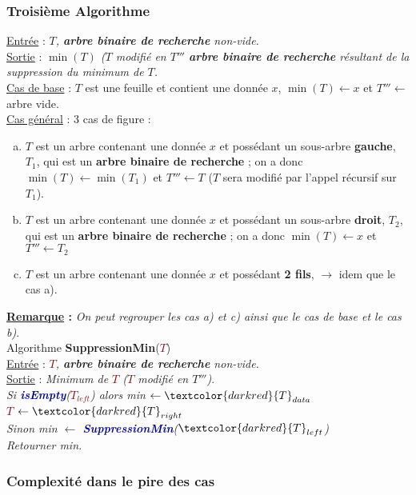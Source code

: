 \documentclass{article}
\newcommand{\abr}{\textbf{arbre binaire de recherche }}
\newcommand{\algo}[1]{\textcolor{darkblue}{\textbf{#1}}}
\newcommand{\param}[1]{\textcolor{darkred}{#1}}
\begin{document}
\subsubsection{Troisième Algorithme}

\noindent\underline{Entrée} : \textit{$T$, \abr non-vide.} \\
\underline{Sortie} : \textit{$\min{(T)}$ ($T$ modifié en $T'''$ \abr résultant de la suppression du minimum de $T$.} \\

\noindent\underline{Cas de base} : $T$ est une feuille et contient une donnée $x$, $\min{(T)}\leftarrow x$ et 
$T'''\leftarrow$ arbre vide.\\
\underline{Cas général} : 3 cas de figure : \\
\begin{enumerate}[a)]
 \item $T$ est un arbre contenant une donnée $x$ et possédant un sous-arbre \textbf{gauche}, $T_1$, qui est un \abr;
on a donc $\min{(T)} \leftarrow \min{(T_1)}$ et $T''' \leftarrow T$ ($T$ sera modifié par l'appel récursif sur $T_1$).
 \item $T$ est un arbre contenant une donnée $x$ et possédant un sous-arbre \textbf{droit}, $T_2$, qui est un \abr;
on a donc $\min{(T)} \leftarrow x$ et $T''' \leftarrow T_2$
 \item $T$ est un arbre contenant une donnée $x$ et possédant \textbf{2 fils}, $\rightarrow$ idem que le cas a).
\end{enumerate}

\textbf{\underline{Remarque} :} \textit{On peut regrouper les cas a) et c) ainsi que le cas de base et le cas b)}. \\

\noindent Algorithme \textbf{SuppressionMin}(\param{$T$}) \\
\underline{Entrée} : \textit{\param{$T$}, \abr non-vide.} \\
\underline{Sortie} : \textit{Minimum de \param{$T$} (\param{$T$} modifié en $T'''$)}.\\
\textit
{
Si \algo{isEmpty}(\param{$T_{left}$}) alors min $\leftarrow \param{T}_{data}$ \\
\indent\indent\indent\indent\indent\indent\indent\indent \param{$T$} $\leftarrow \param{T}_{right}$ \\
Sinon min $\leftarrow$ \algo{SuppressionMin}($\param{T}_{left}$)\\
Retourner min.
}

\subsubsection{Complexité dans le pire des cas}
\end{document}
